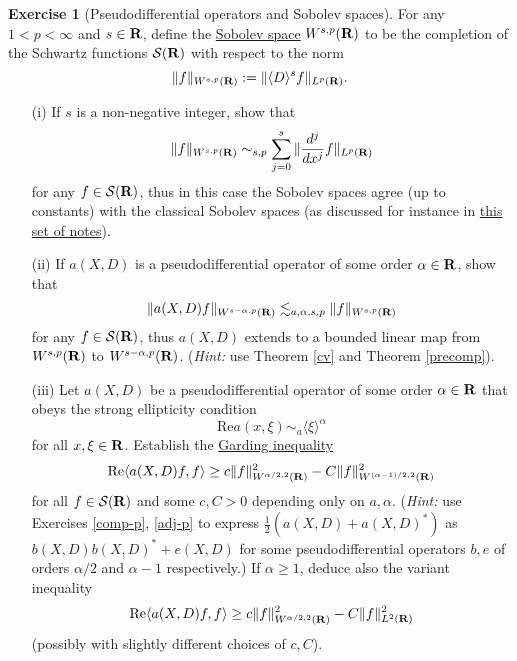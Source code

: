 \documentclass[11pt]{article}
\theoremstyle{definition}
\newtheorem{exercise}[theorem]{Exercise}
\begin{document}
\begin{exercise}[Pseudodifferential operators and Sobolev spaces]
 \label{sob} For any \({1 < p < \infty}\) and \({s \in {\bf R}}\), define the \href{https://en.wikipedia.org/wiki/Sobolev_space}{Sobolev space} \({W^{s,p}({\bf R})}\) to be the completion of the Schwartz functions \({{\mathcal S}({\bf R})}\) with respect to the norm 
\[\displaystyle  \|f\|_{W^{s,p}({\bf R})} := \| \langle D \rangle^s f \|_{L^p({\bf R})}.\]
\begin{itemize}

\item[(i)] If \({s}\) is a non-negative integer, show that
\[\displaystyle  \|f\|_{W^{s,p}({\bf R})} \sim_{s,p} \sum_{j=0}^s \| \frac{d^j}{dx^j} f\|_{L^p({\bf R})}\]
 for any \({f \in {\mathcal S}({\bf R})}\), thus in this case the Sobolev spaces agree (up to constants) with the classical Sobolev spaces (as discussed for instance in \href{https://terrytao.wordpress.com/2009/04/30/245c-notes-4-sobolev-spaces/}{this set of notes}). 
\item[(ii)] If \({a(X,D)}\) is a pseudodifferential operator of some order \({\alpha \in {\bf R}}\), show that
\[\displaystyle  \|a(X,D) f\|_{W^{s-\alpha,p}({\bf R})} \lesssim_{a,\alpha,s,p} \|f\|_{W^{s,p}({\bf R})}\]
 for any \({f \in {\mathcal S}({\bf R})}\), thus \({a(X,D)}\) extends to a bounded linear map from \({W^{s,p}({\bf R})}\) to \({W^{s-\alpha,p}({\bf R})}\). (\emph{Hint:} use Theorem \ref{cv} and Theorem \ref{precomp}). 
\item[(iii)] Let \({a(X,D)}\) be a pseudodifferential operator of some order \({\alpha \in {\bf R}}\) that obeys the strong ellipticity condition
\[\displaystyle  \mathrm{Re} a(x,\xi) \sim_a \langle \xi \rangle^\alpha\]
 for all \({x,\xi \in {\bf R}}\). Establish the \href{https://en.wikipedia.org/wiki/G%C3%A5rding%27s_inequality}{Garding inequality} 
\[\displaystyle  \mathrm{Re} \langle a(X,D) f, f \rangle \geq c \| f\|_{W^{\alpha/2, 2}({\bf R})}^2 - C \| f \|_{W^{(\alpha-1)/2,2}({\bf R})}^2 \]
 for all \({f \in {\mathcal S}({\bf R})}\) and some \({c,C>0}\) depending only on \({a,\alpha}\). (\emph{Hint:} use Exercises \ref{comp-p}, \ref{adj-p} to express \({\frac{1}{2} (a(X,D) + a(X,D)^*)}\) as \({b(X,D) b(X,D)^* + e(X,D)}\) for some pseudodifferential operators \({b,e}\) of orders \({\alpha/2}\) and \({\alpha-1}\) respectively.) If \({\alpha \geq 1}\), deduce also the variant inequality 
\[\displaystyle  \mathrm{Re} \langle a(X,D) f, f \rangle \geq c \| f\|_{W^{\alpha/2, 2}({\bf R})}^2 - C \| f \|_{L^2({\bf R})}^2 \]
 (possibly with slightly different choices of \({c,C}\)). 

\end{itemize}

\end{exercise}
\end{document}

